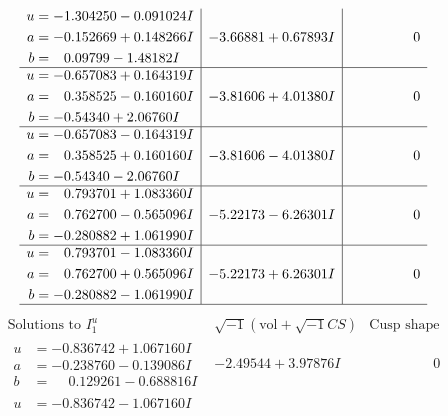 \documentclass[1p]{elsarticle_modified}
\theoremstyle{definition}
\newcommand{\I}{\sqrt{-1}}
\begin{document}
$$\begin{array}{c|c|c}
\begin{aligned}
u &= -1.304250 - 0.091024 I \\
a &= -0.152669 + 0.148266 I \\
b &= \phantom{-}0.09799 - 1.48182 I\end{aligned}
 & -3.66881 + 0.67893 I & \phantom{-0.000000 } 0 \\ \hline\begin{aligned}
u &= -0.657083 + 0.164319 I \\
a &= \phantom{-}0.358525 - 0.160160 I \\
b &= -0.54340 + 2.06760 I\end{aligned}
 & -3.81606 + 4.01380 I & \phantom{-0.000000 } 0 \\ \hline\begin{aligned}
u &= -0.657083 - 0.164319 I \\
a &= \phantom{-}0.358525 + 0.160160 I \\
b &= -0.54340 - 2.06760 I\end{aligned}
 & -3.81606 - 4.01380 I & \phantom{-0.000000 } 0 \\ \hline\begin{aligned}
u &= \phantom{-}0.793701 + 1.083360 I \\
a &= \phantom{-}0.762700 - 0.565096 I \\
b &= -0.280882 + 1.061990 I\end{aligned}
 & -5.22173 - 6.26301 I & \phantom{-0.000000 } 0 \\ \hline\begin{aligned}
u &= \phantom{-}0.793701 - 1.083360 I \\
a &= \phantom{-}0.762700 + 0.565096 I \\
b &= -0.280882 - 1.061990 I\end{aligned}
 & -5.22173 + 6.26301 I & \phantom{-0.000000 } 0\\
 \hline 
 \end{array}$$\newpage$$\begin{array}{c|c|c}  
\text{Solutions to }I^u_{1}& \I (\text{vol} + \sqrt{-1}CS) & \text{Cusp shape}\\
 \hline 
\begin{aligned}
u &= -0.836742 + 1.067160 I \\
a &= -0.238760 - 0.139086 I \\
b &= \phantom{-}0.129261 - 0.688816 I\end{aligned}
 & -2.49544 + 3.97876 I & \phantom{-0.000000 } 0 \\ \hline\begin{aligned}
u &= -0.836742 - 1.067160 I \\

\end{aligned}
\end{array}$$
\end{document}
